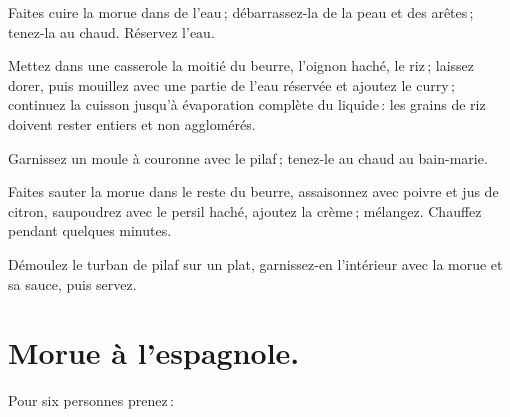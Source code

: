 Faites cuire la morue dans de l’eau ; débarrassez-la de la peau et des arêtes ;
tenez-la au chaud. Réservez l’eau.

Mettez dans une casserole la moitié du beurre, l'oignon haché, le riz ; laissez
dorer, puis mouillez avec une partie de l'eau réservée et ajoutez le curry ;
continuez la cuisson jusqu'à évaporation complète du liquide : les grains de
riz doivent rester entiers et non agglomérés.

Garnissez un moule à couronne avec le pilaf ; tenez-le au chaud au bain-marie.

Faites sauter la morue dans le reste du beurre, assaisonnez avec poivre et jus
de citron, saupoudrez avec le persil haché, ajoutez la crème ; mélangez.
Chauffez pendant quelques minutes.

Démoulez le turban de pilaf sur un plat, garnissez-en l'intérieur avec la morue
et sa sauce, puis servez.

\section*{\centering Morue à l’espagnole.}

Pour six personnes prenez :

\medskip

